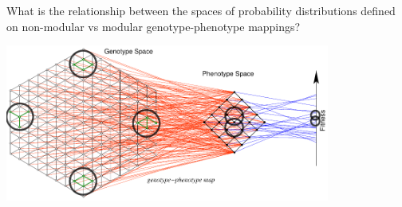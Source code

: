 \begin{frame}
What is the relationship between the spaces of probability distributions defined on non-modular vs modular genotype-phenotype mappings?
\begin{center}
\includegraphics[width=0.8\textwidth]{fig/gpmapgraphs.pdf}
\end{center}
\end{frame}
